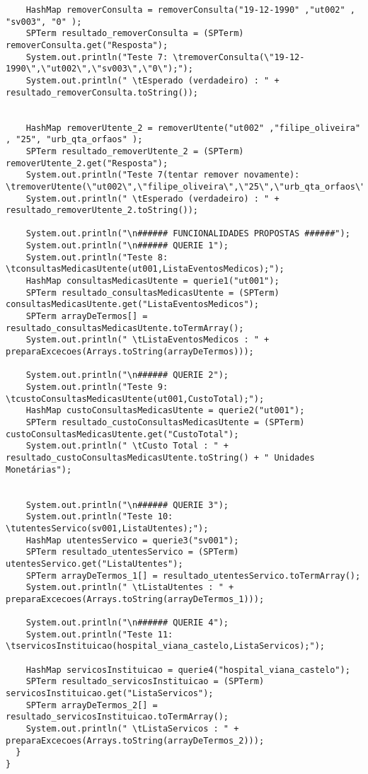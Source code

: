 \documentclass[
  oneside,
  10pt, a4paper,
  footinclude=true,
  headinclude=true,
  cleardoublepage=empty
]{scrbook}
\begin{document}
\begin{lstlisting}
    HashMap removerConsulta = removerConsulta("19-12-1990" ,"ut002" , "sv003", "0" );
    SPTerm resultado_removerConsulta = (SPTerm) removerConsulta.get("Resposta");
    System.out.println("Teste 7: \tremoverConsulta(\"19-12-1990\",\"ut002\",\"sv003\",\"0\");");
    System.out.println(" \tEsperado (verdadeiro) : " + resultado_removerConsulta.toString());


    HashMap removerUtente_2 = removerUtente("ut002" ,"filipe_oliveira" , "25", "urb_qta_orfaos" );
    SPTerm resultado_removerUtente_2 = (SPTerm) removerUtente_2.get("Resposta");
    System.out.println("Teste 7(tentar remover novamente):  \tremoverUtente(\"ut002\",\"filipe_oliveira\",\"25\",\"urb_qta_orfaos\");");
    System.out.println(" \tEsperado (verdadeiro) : " + resultado_removerUtente_2.toString());

    System.out.println("\n###### FUNCIONALIDADES PROPOSTAS ######");
    System.out.println("\n###### QUERIE 1");
    System.out.println("Teste 8: \tconsultasMedicasUtente(ut001,ListaEventosMedicos);");
    HashMap consultasMedicasUtente = querie1("ut001");
    SPTerm resultado_consultasMedicasUtente = (SPTerm) consultasMedicasUtente.get("ListaEventosMedicos");
    SPTerm arrayDeTermos[] = resultado_consultasMedicasUtente.toTermArray();
    System.out.println(" \tListaEventosMedicos : " + preparaExcecoes(Arrays.toString(arrayDeTermos)));

    System.out.println("\n###### QUERIE 2");
    System.out.println("Teste 9: \tcustoConsultasMedicasUtente(ut001,CustoTotal);");
    HashMap custoConsultasMedicasUtente = querie2("ut001");
    SPTerm resultado_custoConsultasMedicasUtente = (SPTerm) custoConsultasMedicasUtente.get("CustoTotal");
    System.out.println(" \tCusto Total : " + resultado_custoConsultasMedicasUtente.toString() + " Unidades Monetárias");


    System.out.println("\n###### QUERIE 3");
    System.out.println("Teste 10: \tutentesServico(sv001,ListaUtentes);");	
    HashMap utentesServico = querie3("sv001");
    SPTerm resultado_utentesServico = (SPTerm) utentesServico.get("ListaUtentes");
    SPTerm arrayDeTermos_1[] = resultado_utentesServico.toTermArray();
    System.out.println(" \tListaUtentes : " + preparaExcecoes(Arrays.toString(arrayDeTermos_1)));

    System.out.println("\n###### QUERIE 4");
    System.out.println("Teste 11: \tservicosInstituicao(hospital_viana_castelo,ListaServicos);");

    HashMap servicosInstituicao = querie4("hospital_viana_castelo");
    SPTerm resultado_servicosInstituicao = (SPTerm) servicosInstituicao.get("ListaServicos");
    SPTerm arrayDeTermos_2[] = resultado_servicosInstituicao.toTermArray();
    System.out.println(" \tListaServicos : " + preparaExcecoes(Arrays.toString(arrayDeTermos_2)));
  }
}
\end{lstlisting}
\end{document}
